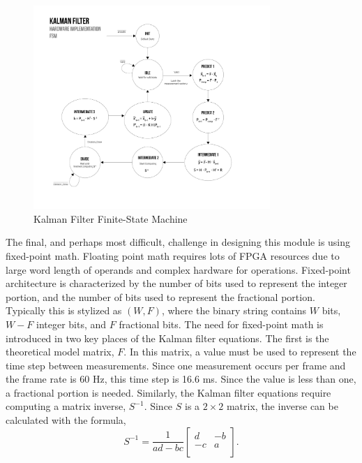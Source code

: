 \documentclass[11pt]{article} %
\begin{document}
\begin{figure}[h]
\centering
\includegraphics[width=0.8\textwidth]{./images/kalman_fsm.jpg}
\caption{Kalman Filter Finite-State Machine}
\label{fig:kalmanFSM}
\end{figure}
The final, and perhaps most difficult, challenge in designing this module is using fixed-point math. Floating point math requires lots of FPGA resources due to large word length of operands and complex hardware for operations. Fixed-point architecture is characterized by the number of bits used to represent the integer portion, and the number of bits used to represent the fractional portion. Typically this is stylized as $(W, F)$, where the binary string contains $W$ bits, $W-F$ integer bits, and $F$ fractional bits. The need for fixed-point math is introduced in two key places of the Kalman filter equations. The first is the theoretical model matrix, $F$. In this matrix, a value must be used to represent the time step between measurements. Since one measurement occurs per frame and the frame rate is 60 Hz, this time step is 16.6 ms. Since the value is less than one, a fractional portion is needed. Similarly, the Kalman filter equations require computing a matrix inverse, $S^{-1}$. Since $S$ is a $2 \times 2$ matrix, the inverse can be calculated with the formula,
\begin{equation}
S^{-1} = \frac{1}{ad - bc}
\begin{bmatrix}
d & -b \\
-c & a \\
\end{bmatrix}.
\label{eq:inv}
\end{equation}
\end{document}
